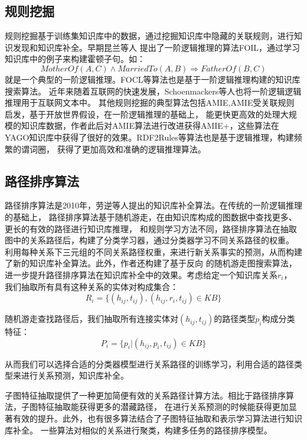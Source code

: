 \subsection{规则挖掘}
规则挖掘基于训练集知识库中的数据，通过挖掘知识库中隐藏的关联规则，进行知识发现和知识库补全。早期昆兰等人
提出了一阶逻辑推理的算法FOIL\cite{Quinlan1993FOILAM}，通过学习知识库中的例子来构建霍顿子句。如：
$$MotherOf(A,C)\land MarriedTo(A,B)\Rightarrow FatherOf(B,C)$$
就是一个典型的一阶逻辑推理。FOCL\cite{PAZZANI1991DetectingAC}等算法也是基于一阶逻辑推理构建的知识库搜索算法。
近年来随着互联网的快速发展，Schoenmackers\cite{Schoenmackers:2010}等人也将一阶逻辑逻辑推理用于互联网文本中。
其他规则挖掘的典型算法包括AMIE\cite{Galarraga2013},AMIE受关联规则启发，基于开放世界假设，在一阶逻辑推理的基础上，
能更快更高效的处理大规模的知识库数据，作者此后对AMIE算法进行改进获得AMIE+\cite{Galrraga2015FastRM}，这些算法在
YAGO知识库中获得了很好的效果。RDF2Rules\cite{Wang2015RDF2RulesLR}等算法也是基于逻辑推理，构建频繁的谓词圈，
获得了更加高效和准确的逻辑推理算法。

\subsection{路径排序算法}
路径排序算法\cite{Lao2010}是2010年，劳逆等人提出的知识库补全算法。在传统的一阶逻辑推理的基础上，
路径排序算法基于随机游走，在由知识库构成的图数据中查找更多、更长的有效的路径进行知识库推理，
和规则学习方法不同，路径排序算法在抽取图中的关系路径后，构建了分类学习器，通过分类器学习不同关系路径的权重。
利用每种关系下三元组的不同关系路径权重，来进行新关系事实的预测，从而构建了新的知识库补全算法。此外，作者还构建了基于反向
的随机游走图搜索算法\cite{Lao2015LearningRF}，进一步提升路径排序算法在知识库补全中的效果。考虑给定一个知识库关系$r_i$，
我们抽取所有具有这种关系的实体对构成集合：
$$R_i=\{{(h_{ij},t_{ij}),(h_{ij},r_i,t_{ij})\in KB}\}$$

随机游走查找路径后，我们抽取所有连接实体对$(h_{ij},t_{ij})$的路径类型$p_i$构成分类特征：
$$P_i=\{{p_i|(h_{ij},p_i,t_{ij})\in KB}\}$$

从而我们可以选择合适的分类器模型进行关系路径的训练学习，利用合适的路径类型来进行关系预测，知识库补全。

子图特征抽取\cite{Gardner2015}提供了一种更加简便有效的关系路径计算方法。相比于路径排序算法，子图特征抽取能获得更多的潜藏路径，
在进行关系预测的时候能获得更加显著有效的提升。此外，也有很多算法结合了子图特征抽取和表示学习算法\cite{Gardner2014}进行知识库补全。
一些算法对相似的关系进行聚类，构建多任务的路径排序模型\cite{Wang2016}。


